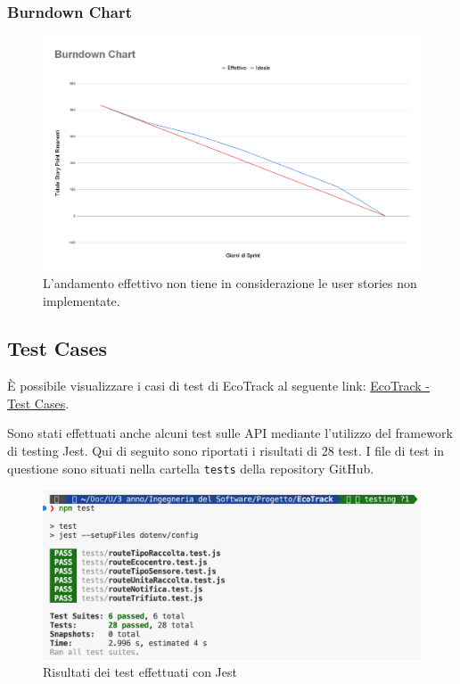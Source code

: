 \subsubsection{Burndown Chart}
\begin{figure} [H]
    \centering
    \includegraphics[width=1\linewidth]{D4-G1//Img/Burndown Chart - Sprint 2.png}
    \caption{L'andamento effettivo non tiene in considerazione le user stories non implementate.}
    \label{fig:enter-label}
\end{figure}

\subsection{Test Cases}
È possibile visualizzare i casi di test di EcoTrack al seguente link: \href{https://docs.google.com/spreadsheets/d/19TjIHKf8wvDxEds9eg8yDFcew4lJyGeI82jz5czIyQI/edit?usp=sharing}{EcoTrack - Test Cases}.

Sono stati effettuati anche alcuni test sulle API mediante l'utilizzo del framework di testing Jest. Qui di seguito sono riportati i risultati di 28 test. I file di test in questione sono situati nella cartella \texttt{tests} della repository GitHub.
\begin{figure}[H]
    \centering
    \includegraphics[width=1\linewidth]{D4-G1//Img/Testing_Jest.png}
    \caption{Risultati dei test effettuati con Jest}
    \label{fig:enter-label}
\end{figure}

